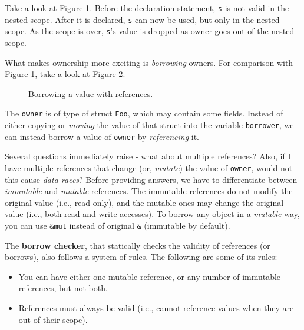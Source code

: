 Take a look at \hyperref[rustex1]{Figure 1}. Before the declaration statement,
\texttt{s} is not valid in the nested scope. After it is declared, 
\texttt{s} can now be used, but only in the nested scope. As the scope
is over, \texttt{s}'s value is dropped as owner goes out of the nested scope.

What makes ownership more exciting is \textit{borrowing} owners. For comparison
with \hyperref[rustex1]{Figure 1}, take a look at \hyperref[rustex2]{Figure 2}.

\begin{figure*}[ht]
    \begin{center}
    
    \end{center}
    \caption{Borrowing a value with references.}
    \label{rustex2}
\end{figure*}

The \texttt{owner} is of type of struct \texttt{Foo}, which may contain some fields.
Instead of either copying or \textit{moving} the value of that struct into the variable
\texttt{borrower}, we can instead borrow a value of \texttt{owner} by \textit{referencing}
it.

Several questions immediately raise - what about multiple references? Also, if I have 
multiple references that change (or, \textit{mutate}) the value of \texttt{owner},
would not this cause \textit{data races}? Before providing answers, we have to differentiate
between \textit{immutable} and \textit{mutable} references. The immutable references do not
modify the original value (i.e., read-only), and the mutable ones may
change the original value (i.e., both read and write accesses). To borrow
any object in a \textit{mutable} way, you can use \texttt{\&mut} instead of
original \texttt{\&} (immutable by default).

The \textbf{borrow checker}, that statically checks the validity of references (or borrows),
also follows a system of rules. The following are some of its rules:

\begin{itemize}
    \item You can have either one mutable reference, or any number of immutable references,
          but not both.
    \item References must always be valid (i.e., cannot reference values when they are out
         of their scope).
\end{itemize}


